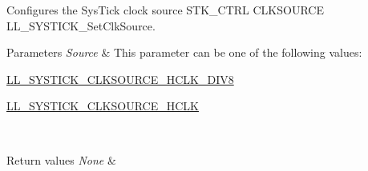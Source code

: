 Configures the Sys\+Tick clock source  S\+T\+K\+\_\+\+C\+T\+RL C\+L\+K\+S\+O\+U\+R\+CE L\+L\+\_\+\+S\+Y\+S\+T\+I\+C\+K\+\_\+\+Set\+Clk\+Source. 


\begin{DoxyParams}{Parameters}
{\em Source} & This parameter can be one of the following values\+: \begin{DoxyItemize}
\item \hyperlink{group___c_o_r_t_e_x___l_l___e_c___c_l_k_s_o_u_r_c_e___h_c_l_k_gab13c4588c1b1a8b867541a4ad928d205}{L\+L\+\_\+\+S\+Y\+S\+T\+I\+C\+K\+\_\+\+C\+L\+K\+S\+O\+U\+R\+C\+E\+\_\+\+H\+C\+L\+K\+\_\+\+D\+I\+V8} \item \hyperlink{group___c_o_r_t_e_x___l_l___e_c___c_l_k_s_o_u_r_c_e___h_c_l_k_gaa92530d2f2cd8ce785297e4aed960ff0}{L\+L\+\_\+\+S\+Y\+S\+T\+I\+C\+K\+\_\+\+C\+L\+K\+S\+O\+U\+R\+C\+E\+\_\+\+H\+C\+LK} \end{DoxyItemize}
\\
\hline
\end{DoxyParams}

\begin{DoxyRetVals}{Return values}
{\em None} & \\
\hline
\end{DoxyRetVals}
